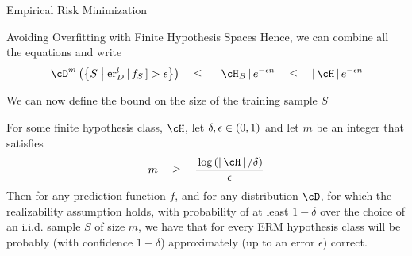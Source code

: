 \documentclass[11pt,a4paper]{article}
\begin{document}
\begin{ssection}{Empirical Risk Minimization}
\begin{ssubsection}{Avoiding Overfitting with Finite Hypothesis Spaces}
		Hence, we can combine all the equations and write
		\begin{align*}
			\func{\cD^m}{\set{S \pipe \err[_D^l]{f_S} > \epsilon}}	\qle	\abs{\cH_B} \exp{-\epsilon n}	\qle	\abs{\cH} \exp{-\epsilon n}
		\end{align*} \sbr

		We can now define the bound on the size of the training sample $S$

		\begin{theorem}
			For some finite hypothesis class, $\cH$, let $\delta, \epsilon \in \left( {0, 1} \right)$ and let $m$ be an integer that satisfies
			\begin{align*}
				m	\qge	\frac{\log{\abs{\cH} / \delta}}{\epsilon}
			\end{align*}
			Then for any prediction function $f$, and for any distribution $\cD$, for which the realizability assumption holds, with probability of at least $1 - \delta$ over the choice of an i.i.d. sample $S$ of size $m$, we have that for every ERM hypothesis class will be probably (with confidence $1 - \delta$) approximately (up to an error $\epsilon$) correct.
		\end{theorem}

	\end{ssubsection}

\end{ssection}



\end{document}
